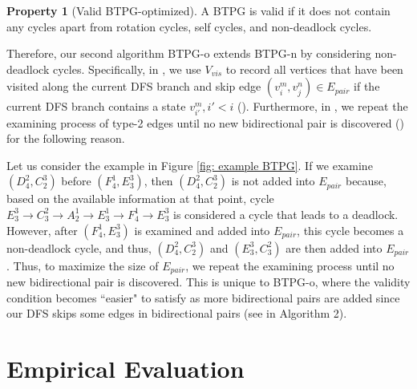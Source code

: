 \documentclass[letterpaper]{article} %
\theoremstyle{definition}
\newtheorem{property}{Property}
\begin{document}
\begin{property}[Valid BTPG-optimized]\label{pro:BTPG-o}
A BTPG is valid if it does not contain any cycles apart from rotation cycles, self cycles, and non-deadlock cycles.
\end{property}

Therefore, our second algorithm BTPG-o extends BTPG-n by considering non-deadlock cycles. Specifically, in , we use $V_{vis}$ to record all vertices that have been visited along the current DFS branch and skip edge $(v_i^m, v_j^n) \in E_{pair}$ if the current DFS branch contains a state $v_{i'}^m, i'<i$ (). Furthermore, in , we repeat the examining process of type-2 edges until no new bidirectional pair is discovered () for the following reason.











Let us consider the example in Figure \ref{fig: example BTPG}.
If we examine $(D^2_4,C^3_2)$ before $(F^1_4,E^3_3)$, then $(D^2_4,C^3_2)$ is not added into $E_{pair}$ because, based on the available information at that point, cycle $E^3_3 \rightarrow C^2_3 \rightarrow A^1_2  \rightarrow E^1_3 \rightarrow F^1_4 \rightarrow E^3_3$ is considered a cycle that leads to a deadlock. However, after $(F^1_4, E^3_3)$ is examined and added into $E_{pair}$, this cycle becomes a non-deadlock cycle, and thus, $(D^2_4,C^3_2)$ and $(E^3_3,C^2_3)$ are then added into $E_{pair}$.
Thus, to maximize the size of $E_{pair}$, we repeat the examining process until no new bidirectional pair is discovered. This is unique to BTPG-o, where the validity condition becomes ``easier" to satisfy as more bidirectional pairs are added since our DFS skips some edges in bidirectional pairs (see  in Algorithm 2). %

\section{Empirical Evaluation}
\end{document}
